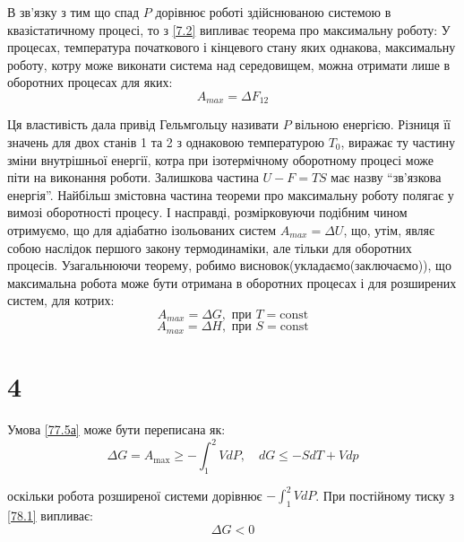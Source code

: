 В зв'язку з тим що спад $P$ дорівнює роботі здійснюваною системою в квазістатичному процесі, то з \eqref{7.2} випливає теорема про максимальну роботу: У процесах, температура початкового і кінцевого стану яких однакова, максимальну роботу, котру може виконати система над середовищем, можна отримати лише в оборотних процесах для яких:
\begin{equation}\label{7.8}
	A_{max} = \Delta F_{12}
\end{equation}

Ця властивість дала привід Гельмгольцу називати $P$ вільною енергією. Різниця її значень для двох станів 1 та 2 з однаковою температурою $T_0$, виражає ту частину зміни внутрішньої енергії, котра при ізотермічному оборотному процесі може піти на виконання роботи. Залишкова частина $U-F=TS$ має назву \enquote{зв'язкова енергія}. Найбільш змістовна частина теореми про максимальну роботу полягає у вимозі оборотності процесу. І насправді, розмірковуючи подібним чином отримуємо, що для адіабатно ізольованих систем $A_{max} = \Delta U$,
що, утім, являє собою наслідок першого закону термодинаміки, але тільки для оборотних процесів. Узагальнюючи теорему, робимо висновок(укладаємо(заключаємо)), що максимальна робота може бути отримана в оборотних процесах і для розширених систем, для котрих:
\begin{equation}\label{7.9a}\tag{7.9а}
	A_{max} = \Delta G, \text{ при } T = \text{const}
\end{equation}
\begin{equation}\label{7.9b}\tag{7.9б}
	A_{max} = \Delta H, \text{ при } S = \text{const}
\end{equation}

\section{4}


Умова \eqref{77.5а} може бути переписана як:
\begin{equation}\label{78.1}
\Delta G = A_{\max} \geq -\int_{1}^{2}VdP, \quad dG \leq -SdT + Vdp
\end{equation}

оскільки робота розширеної системи дорівнює $-\int_{1}^{2}VdP$. При постійному тиску з \eqref{78.1} випливає:
\begin{equation}\label{78.2}
\Delta G < 0
\end{equation}

